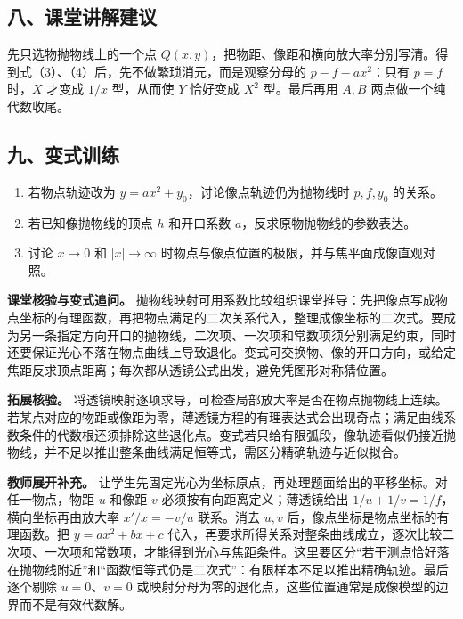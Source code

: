 \documentclass[12pt,a4paper,UTF8]{ctexart}
\newcommand{\tightlist}{\setlength{\itemsep}{0pt}\setlength{\parskip}{0pt}}
\begin{document}
\subsection{八、课堂讲解建议}\label{ux516bux8bfeux5802ux8bb2ux89e3ux5efaux8bae-5}

先只选物抛物线上的一个点
\(Q(x,y)\)，把物距、像距和横向放大率分别写清。得到式（3）、（4）后，先不做繁琐消元，而是观察分母的
\(p-f-ax^2\)：只有 \(p=f\) 时，\(X\) 才变成 \(1/x\) 型，从而使 \(Y\)
恰好变成 \(X^2\) 型。最后再用 \(A,B\) 两点做一个纯代数收尾。

\subsection{九、变式训练}\label{ux4e5dux53d8ux5f0fux8badux7ec3-5}

\begin{enumerate}
\def\labelenumi{\arabic{enumi}.}
\tightlist
\item
  若物点轨迹改为 \(y=ax^2+y_0\)，讨论像点轨迹仍为抛物线时 \(p,f,y_0\)
  的关系。
\item
  若已知像抛物线的顶点 \(h\) 和开口系数
  \(a\)，反求原物抛物线的参数表达。
\item
  讨论 \(x\to0\) 和 \(|x|\to\infty\)
  时物点与像点位置的极限，并与焦平面成像直观对照。
\end{enumerate}

\textbf{课堂核验与变式追问。}
抛物线映射可用系数比较组织课堂推导：先把像点写成物点坐标的有理函数，再把物点满足的二次关系代入，整理成像坐标的二次式。要成为另一条指定方向开口的抛物线，二次项、一次项和常数项须分别满足约束，同时还要保证光心不落在物点曲线上导致退化。变式可交换物、像的开口方向，或给定焦距反求顶点距离；每次都从透镜公式出发，避免凭图形对称猜位置。

\textbf{拓展核验。}
将透镜映射逐项求导，可检查局部放大率是否在物点抛物线上连续。若某点对应的物距或像距为零，薄透镜方程的有理表达式会出现奇点；满足曲线系数条件的代数根还须排除这些退化点。变式若只给有限弧段，像轨迹看似仍接近抛物线，并不足以推出整条曲线满足恒等式，需区分精确轨迹与近似拟合。

\textbf{教师展开补充。}
让学生先固定光心为坐标原点，再处理题面给出的平移坐标。对任一物点，物距
\(u\) 和像距 \(v\) 必须按有向距离定义；薄透镜给出
\(1/u+1/v=1/f\)，横向坐标再由放大率 \(x'/x=-v/u\) 联系。消去 \(u,v\)
后，像点坐标是物点坐标的有理函数。把 \(y=ax^2+bx+c\)
代入，再要求所得关系对整条曲线成立，逐次比较二次项、一次项和常数项，才能得到光心与焦距条件。这里要区分``若干测点恰好落在抛物线附近''和``函数恒等式仍是二次式''：有限样本不足以推出精确轨迹。最后逐个剔除
\(u=0\)、\(v=0\)
或映射分母为零的退化点，这些位置通常是成像模型的边界而不是有效代数解。
\end{document}
